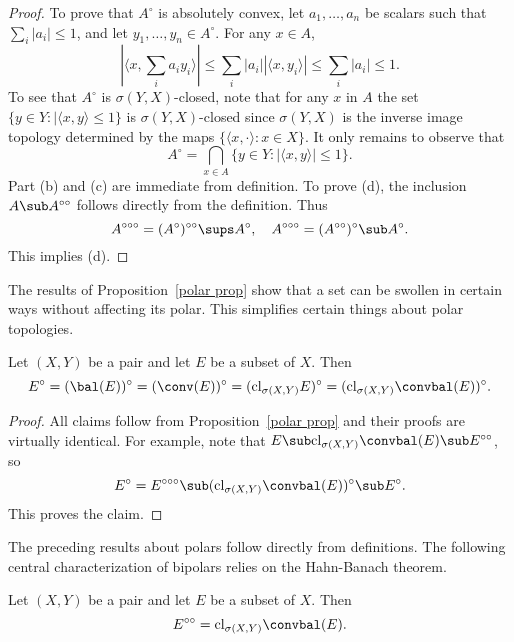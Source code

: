 \begin{proof}
To prove that $A^\circ$ is absolutely convex, let $a_1,\dots,a_n$ be scalars such that $\sum_i|a_i|\leq 1$, and let $y_1,\dots,y_n\in A^\circ$. For any $x\in A$,
\[|\langle x,\sum_ia_iy_i\rangle|\leq\sum_i|a_i||\langle x,y_i\rangle|\leq\sum_i|a_i|\leq 1.\]
To see that $A^\circ$ is $\sigma(Y,X)$-closed, note that for any $x$ in $A$ the set $\{y\in Y:|\langle x,y\rangle\leq 1\}$ is $\sigma(Y,X)$-closed since $\sigma(Y,X)$ is the inverse image topology determined by the maps $\{\langle x,\cdot\rangle:x\in X\}$. It only remains to observe that
\[A^\circ=\bigcap_{x\in A}\{y\in Y:|\langle x,y\rangle|\leq 1\}.\]
Part (b) and (c) are immediate from definition. To prove (d), the inclusion $A\sub A^{\circ\circ} $ follows directly from the definition. Thus
\[A^{\circ\circ\circ}=(A^\circ)^{\circ\circ}\sups A^\circ,\quad A^{\circ\circ\circ}=(A^{\circ\circ})^\circ\sub A^\circ.\]
This implies (d).
\end{proof}
The results of Proposition~\ref{polar prop} show that a set can be swollen in certain ways without affecting its polar. This simplifies certain things about polar topologies.
\begin{proposition}\label{polar of hull and closure}
Let $(X,Y)$ be a pair and let $E$ be a subset of $X$. Then
\[E^\circ=(\bal(E))^\circ=(\conv(E))^\circ=(\mathrm{cl}_{\sigma(X,Y)}E)^\circ=(\mathrm{cl}_{\sigma(X,Y)}\convbal(E))^\circ.\]
\end{proposition}
\begin{proof}
All claims follow from Proposition~\ref{polar prop} and their proofs are virtually identical. For example, note that $E\sub\mathrm{cl}_{\sigma(X,Y)}\convbal(E)\sub E^{\circ\circ}$, so
\[E^{\circ}=E^{\circ\circ\circ}\sub (\mathrm{cl}_{\sigma(X,Y)}\convbal(E))^\circ\sub E^\circ.\]
This proves the claim.
\end{proof}
The preceding results about polars follow directly from definitions. The following central characterization of bipolars relies on the Hahn-Banach theorem.
\begin{theorem}
Let $(X,Y)$ be a pair and let $E$ be a subset of $X$. Then
\[E^{\circ\circ}=\mathrm{cl}_{\sigma(X,Y)}\convbal(E).\]
\end{theorem}
